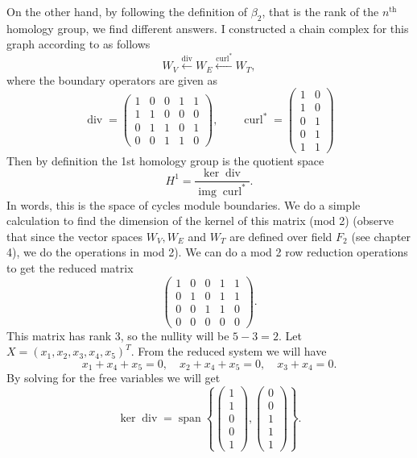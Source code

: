 \documentclass[11pt,a4paper]{article}
\newcommand{\curl}{\operatorname{curl}}
\renewcommand{\div}{\operatorname{div}}
\newcommand{\img}{\operatorname{img}}
\begin{document}
	On the other hand, by following the definition of $ \beta_2 $, that is the rank of the $ n^\text{th} $ homology group, we find different answers. I constructed a chain complex for this graph according to \cite{Lim2019} as follows
	\[ W_V \xleftarrow{\div} W_E \xleftarrow{\curl^*} W_T, \]
	where the boundary operators are given as
	\[ \div = \begin{pmatrix}
		1 & 0 & 0 & 1 & 1 \\
		1 & 1 & 0 & 0 & 0 \\
		0 & 1 & 1 & 0 & 1 \\
		0 & 0 & 1 & 1 & 0
	\end{pmatrix}, \qquad
	\curl^* = \begin{pmatrix}
		1 & 0 \\
		1 & 0 \\
		0 & 1 \\
		0 & 1 \\
		1 & 1 
	\end{pmatrix} \]
	Then by definition the 1st homology group is the quotient space
	\[ H^1 = \frac{\ker \div }{\img \curl^*}. \]
	In words, this is the space of cycles module boundaries. We do a simple calculation to find the dimension of the kernel of this matrix (mod 2) (observe that since the vector spaces $ W_V, W_E $ and $ W_T $ are defined over field $ F_2 $ (see \cite{Gross2005} chapter 4), we do the operations in mod 2). We can do a mod 2 row reduction operations to get the reduced matrix
	\[ \begin{pmatrix}
		1 & 0 & 0 & 1 & 1 \\
		0 & 1 & 0 & 1 & 1 \\
		0 & 0 & 1 & 1 & 0 \\
		0 & 0 & 0 & 0 & 0
	\end{pmatrix}. \]
	This matrix has rank 3, so the nullity will be $ 5 - 3 = 2 $. Let $ X = (x_1,x_2,x_3,x_4,x_5)^T $. From the reduced system we will have
	\[ x_1 + x_4 + x_5 = 0, \quad x_2 + x_4 + x_5 = 0, \quad x_3 + x_4 = 0. \]
	By solving for the free variables we will get 
	\[
	\ker \div = \operatorname{span} \left\{
	\begin{pmatrix}
		1 \\ 1 \\ 0 \\ 0 \\ 1
	\end{pmatrix},
	\begin{pmatrix}
		0 \\ 0 \\ 1 \\ 1 \\ 1
	\end{pmatrix}
	\right\}.
	\]
	
\end{document}
